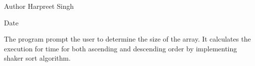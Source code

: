 \begin{DoxyAuthor}{Author}
Harpreet Singh 
\end{DoxyAuthor}
\begin{DoxyDate}{Date}

\end{DoxyDate}
The program prompt the user to determine the size of the array. It calculates the execution for time for both ascending and descending order by implementing shaker sort algorithm. 